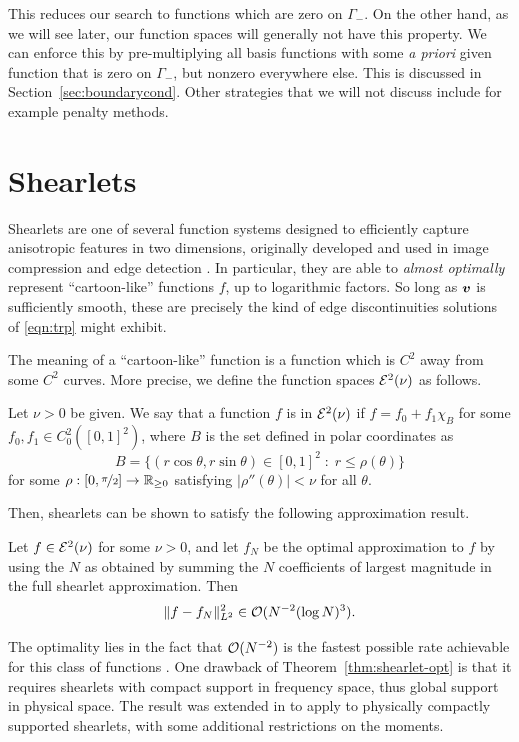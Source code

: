 This reduces our search to functions which are zero on $\Gamma_-$. On the other hand, as we will see later,
our function spaces will generally not have this property. We can enforce this by pre-multiplying all basis
functions with some {\em a priori} given function that is zero on $\Gamma_-$, but nonzero everywhere else.
This is discussed in Section~\ref{sec:boundarycond}. Other strategies that we will not discuss include for
example penalty methods.

\section{Shearlets}

Shearlets are one of several function systems designed to efficiently capture anisotropic features in two
dimensions, originally developed and used in image compression and
edge detection \cite{Labate2005smr, Easley2008sdi}.
In particular, they are able to {\em almost optimally} represent ``cartoon-like'' functions $f$, up to
logarithmic factors. So long as ${\bm v}$ is sufficiently smooth, these are precisely the kind of edge
discontinuities solutions of \eqref{eqn:trp} might exhibit.

The meaning of a ``cartoon-like'' function is a function which is $C^2$ away from some $C^2$ curves. More
precise, we define the function spaces $\mathcal{E}^2(\nu)$ as follows.
\begin{definition}
Let $\nu>0$ be given. We say that a function $f$ is in $\mathcal{E}^2(\nu)$ if $f = f_0 + f_1\chi_B$ for some $f_0,
f_1 \in C^2_0([0,1]^2)$, where $B$ is the set defined in polar coordinates as
\[
    B = \{ (r\cos\theta,r\sin\theta) \in [0,1]^2 \;:\; r \leq \rho(\theta) \}
\]
for some $\rho :  [0,\nicefrac{\pi}{2}] \to \mathbb{R}_{\geq0}$ satisfying $|\rho''(\theta)| < \nu$ for all $\theta$.
\end{definition}
Then, shearlets can be shown to satisfy the following approximation result.
\begin{theorem} \label{thm:shearlet-opt}
Let $f\in\mathcal{E}^2(\nu)$ for some $\nu>0$, and let $f_N$ be the optimal approximation to $f$ by using the $N$ as
obtained by summing the $N$ coefficients of largest magnitude in the full shearlet approximation. Then
\[
    \|f-f_N\|_{L^2}^2 \in \mathcal{O}(N^{-2} (\log N)^3).
\]
\end{theorem}
The optimality lies in the fact that $\mathcal{O}(N^{-2})$ is the fastest possible rate achievable for this class of
functions \cite{Donoho2001sci}. One drawback of Theorem~\ref{thm:shearlet-opt} is that it requires shearlets with
compact support in frequency space, thus global support in physical space. The result was extended in
\cite{Kutyniok2011css} to apply to physically compactly supported shearlets, with some additional restrictions on
the moments.

